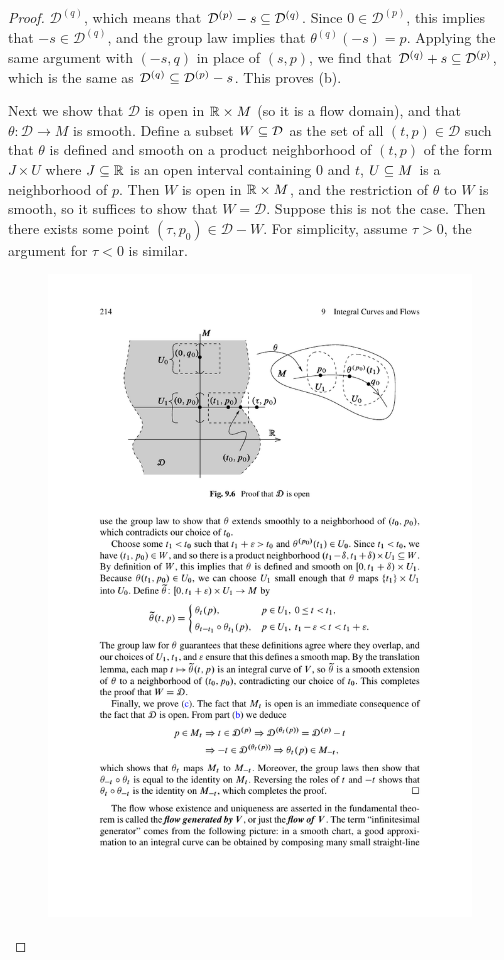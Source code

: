 \begin{proof}
$\mathcal{D}^{(q)}$, which means that $\mathcal{D}^{(p)}-s\subseteq\mathcal{D}^{(q)}$. Since $0\in\mathcal{D}^{(p)}$, this implies that $-s\in\mathcal{D}^{(q)}$, and 
the group law implies that $\theta^{(q)}(-s)=p$. Applying the same argument with $(-s,q)$ in place of $(s,p)$, we find that $\mathcal{D}^{(q)}+s\subseteq\mathcal{D}^{(p)}$, 
which is the same as $\mathcal{D}^{(q)}\subseteq\mathcal{D}^{(p)}-s$. This proves (b).\par
Next we show that $\mathcal{D}$ is open in $\mathbb{R}\times M$ (so it is a flow domain), and that $\theta:\mathcal{D}\to M$ is smooth. Define a subset $W\subseteq\mathcal{D}$ 
as the set of all $(t,p)\in\mathcal{D}$ such that $\theta$ is defined and smooth on a product neighborhood of $(t,p)$ of the form $J\times U$ where $J\subseteq\mathbb{R}$ is 
an open interval containing $0$ and $t$, $U\subseteq M$ is a neighborhood of $p$. Then $W$ is open in $\mathbb{R}\times M$, and the restriction of $\theta$ to $W$ is smooth, 
so it suffices to show that $W=\mathcal{D}$. Suppose this is not the case. Then there exists some point $(\tau,p_0)\in\mathcal{D}-W$. For simplicity, assume $\tau>0$, 
the argument for $\tau<0$ is similar.
\begin{figure}[htbp]
\centering
\includegraphics{pictures/flow-thm}

\end{figure}
\end{proof}
